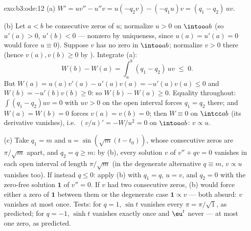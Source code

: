 \begin{solution}{exo:b3:ode:12}
(a) $W' = uv'' - u''v = u(-q_2v) - (-q_1u)v = (q_1 -
q_2)\,uv$.

(b) Let $a < b$ be consecutive zeros of $u$; normalize $u >
0$ on $\intoo ab$ (so $u'(a) > 0$, $u'(b) < 0$ --- nonzero
by uniqueness, since $u(a) = u'(a) = 0$ would force $u
\equiv 0$). Suppose $v$ has no zero in $\intoo ab$;
normalize $v > 0$ there (hence $v(a), v(b) \geq 0$ by
). Integrate (a):
\[
W(b) - W(a) = \int_a^b(q_1 - q_2)\,uv \;\leq\; 0 .
\]
But $W(a) = u(a)v'(a) - u'(a)v(a) = -u'(a)v(a) \leq 0$ and
$W(b) = -u'(b)v(b) \geq 0$: so $W(b) - W(a) \geq 0$.
Equality throughout: $\int(q_1 - q_2)uv = 0$ with $uv > 0$
on the open interval forces $q_1 = q_2$ there; and $W(a) =
W(b) = 0$ forces $v(a) = v(b) = 0$; then $W \equiv 0$ on
$\intcc ab$ (its derivative vanishes), i.e.\
$(v/u)' = -W/u^2 = 0$ on $\intoo ab$: $v \propto u$.

(c) Take $q_1 = m$ and $u = \sin(\sqrt m(t - t_0))$, whose
consecutive zeros are $\pi/\sqrt m$ apart, and $q_2 = q \geq
m$: by (b), every solution $v$ of $v'' + qv = 0$ vanishes in
each open interval of length $\pi/\sqrt m$ (in the
degenerate alternative $q \equiv m$, $v \propto u$ vanishes
too). If instead $q \leq 0$: apply (b) with $q_1 = q$, $u =
v$, and $q_2 = 0$ with the zero-free solution $\mathbf 1$ of
$v'' = 0$. If $v$ had two consecutive zeros, (b) would force
either a zero of $\mathbf 1$ between them or the degenerate
case $\mathbf 1 \propto v$ --- both absurd: $v$ vanishes at
most once. Tests: for $q = 1$, $\sin t$ vanishes every $\pi
= \pi/\sqrt1$, as predicted; for $q = -1$, $\sinh t$
vanishes exactly once and $\eu^t$ never --- at most one
zero, as predicted.
\end{solution}


